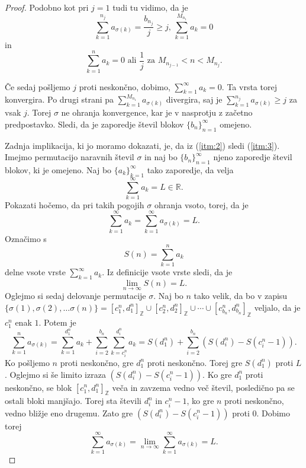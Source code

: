 \documentclass[12pt,a4paper,reqno]{amsart}
\theoremstyle{definition} %
\theoremstyle{plain} %
\newcommand{\R}{\mathbb R}
\newcommand{\Z}{\mathbb Z}
\begin{document}
\begin{proof}
Podobno kot pri $j=1$ tudi tu vidimo, da je $$\sum_{k=1}^{n_j}a_{\sigma(k)}=\frac{b_{n_j}}{j}\geq j\textrm{, }\sum_{k=1}^{M_{n_1}}a_k=0$$ in $$\sum_{k=1}^{n}a_k=0\textrm{ ali }\frac{1}{j}\textrm{ za }M_{n_{j-1}}<n<M_{n_j}.$$%

Če sedaj pošljemo $j$ proti neskončno, dobimo, $\sum_{k=1}^{\infty}a_k=0$. Ta vrsta torej konvergira. Po drugi strani pa $\sum_{k=1}^{M_{n_1}}a_{\sigma(k)}$ divergira, saj je $\sum_{k=1}^{n_j}a_{\sigma(k)}\geq j$ za vsak $j$. Torej $\sigma$ ne ohranja konvergence, kar je v nasprotju z začetno predpostavko. Sledi, da je zaporedje števil blokov $\{b_n\}^{\infty}_{n=1}$ omejeno.

Zadnja implikacija, ki jo moramo dokazati, je, da iz (\ref{itm:2}) sledi (\ref{itm:3}).
Imejmo permutacijo naravnih števil $\sigma$ in naj bo $\{b_n\}_{n=1}^{\infty}$ njeno zaporedje števil blokov, ki je omejeno. Naj bo $\{a_k\}_{k=1}^{\infty}$ tako zaporedje, da velja $$\sum_{k=1}^{\infty}a_k=L\in \R.$$ Pokazati hočemo, da pri takih pogojih $\sigma$ ohranja vsoto, torej, da je $$\sum_{k=1}^{\infty}a_k=\sum_{k=1}^{\infty}a_{\sigma(k)}=L.$$ 
Označimo s $$S(n)=\sum_{k=1}^{n}a_k$$ delne vsote vrste $\sum_{k=1}^{\infty}a_k$. Iz definicije vsote vrste sledi, da je $$\lim_{n\to \infty}S(n)=L.$$ Oglejmo si sedaj delovanje permutacije $\sigma$. Naj bo $n$ tako velik, da bo v zapisu $\{ \sigma (1), \sigma (2), \ldots \sigma (n) \} = [c^n_1, d^n_1]_{\Z} \cup [c^n_2, d^n_2]_{\Z} \cup \cdots \cup [c^n_{b_n}, d^n_{b_n}]_{\Z}$ veljalo, da je $c^n_1$ enak $1$. Potem je 
\begin{equation} \label{eq:5}
\sum_{k=1}^{n}a_{\sigma(k)}=\sum_{k=1}^{d_1^n}a_k+\sum_{i=2}^{b_n}\sum_{k=c_i^n}^{d_i^n}a_k = S(d_1^n)+\sum_{i=2}^{b_n}(S(d_i^n)-S(c_i^n-1)).
\end{equation}
Ko pošljemo $n$ proti neskončno, gre $d_1^n$ proti neskončno. Torej gre $S(d_1^n)$ proti $L$. Oglejmo si še limito izraza $(S(d_i^n)-S(c_i^n-1))$. Ko gre $d_1^n$ proti neskončno, se blok  $[c^n_1, d^n_1]_{\Z}$ veča in zavzema vedno več števil, posledično pa se ostali bloki manjšajo. Torej sta števili $d_i^n$ in $c_i^n-1$, ko gre $n$ proti neskončno, vedno bližje eno drugemu. Zato gre $(S(d_i^n)-S(c_i^n-1))$ proti $0$. Dobimo torej $$\sum_{k=1}^{\infty}a_{\sigma(k)}=\lim_{n \to \infty}\sum_{k=1}^{\infty}a_{\sigma(k)}=L.$$
\end{proof}
\end{document}
